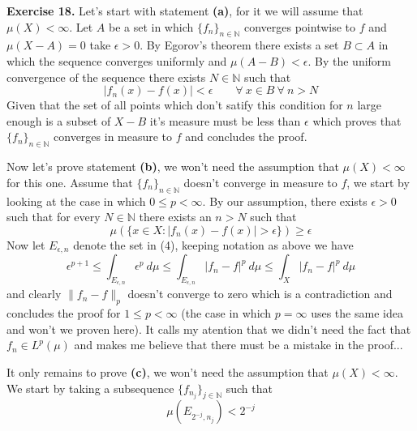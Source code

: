 \documentclass{article}
\begin{document}
\begin{exercise}\textbf{Exercise 18.}
    Let's start with statement \textbf{(a)}, for it we will assume that $\mu \left( X \right) < \infty $. Let $A$ be a set in which $\{f_n\}_{n \in \mathbb{N}}$ converges pointwise to $f$ and $\mu \left( X-A \right) = 0$ take $\epsilon > 0$. By Egorov's theorem there exists a set $B \subset A$ in which the sequence converges uniformly and $\mu \left( A-B \right)  < \epsilon$. By the uniform convergence of the sequence there exists $N \in \mathbb{N}$ such that
    \[
        |f_n \left( x \right) - f \left( x \right) | < \epsilon \qquad \forall\ x \in B\ \forall\ n > N
    \]
    Given that the set of all points which don't satify this condition for $n$ large enough is a subset of $X-B$ it's measure must be less than $\epsilon$ which proves that $\{f_n\}_{n \in \mathbb{N}}$ converges in measure to $f$ and concludes the proof. 

    Now let's prove statement \textbf{(b)}, we won't need the assumption that $\mu \left( X \right) < \infty$ for this one. Assume that $\{f_n\}_{n \in \mathbb{N}}$ doesn't converge in measure to $f$, we start by looking at the case in which $0 \le p < \infty$. By our assumption, there exists $\epsilon > 0$ such that for every $N \in \mathbb{N}$ there exists an $n > N$ such that
    \begin{equation}
        \mu \left( \{ x \in X : |f_n \left( x \right) - f \left( x \right) | > \epsilon \} \right) \ge \epsilon
    \end{equation}
    Now let $E_{\epsilon, n}$ denote the set in (4), keeping notation as above we have
    \[
        \epsilon^{p+1} \le \int_{E_{\epsilon,n}} \epsilon^p \: d\mu \le \int_{E_{\epsilon,n}} |f_n-f|^p\: d\mu \le \int_X |f_n-f|^p\: d\mu 
    \]
    and clearly $\|f_n-f\|_p $ doesn't converge to zero which is a contradiction and concludes the proof for $1 \le p < \infty$ (the case in which $p=\infty$ uses the same idea and won't we proven here). It calls my atention that we didn't need the fact that $f_n \in L^p \left( \mu \right) $ and makes me believe that there must be a mistake in the proof...

    It only remains to prove \textbf{(c)}, we won't need the assumption that $\mu \left( X \right) < \infty$. We start by taking a subsequence $\{f_{n_j}\}_{j \in \mathbb{N}}$ such that
    \begin{equation}
        \mu \left( E_{2^{-j}, n_j} \right) < 2^{-j}
    \end{equation}
\end{exercise}
\end{document}
